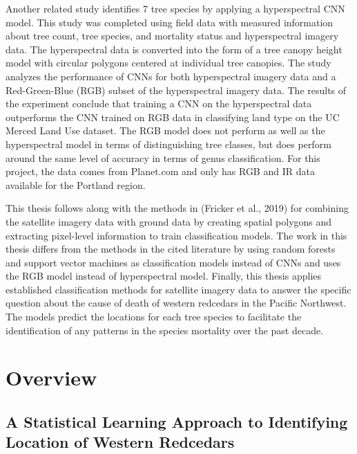 \documentclass[12pt,twoside]{reedthesis}
\begin{document}
Another related study identifies 7 tree species by applying a hyperspectral CNN model. This study was completed using field data with measured information about tree count, tree species, and mortality status and hyperspectral imagery data. The hyperspectral data is converted into the form of a tree canopy height model with circular polygons centered at individual tree canopies. The study analyzes the performance of CNNs for both hyperspectral imagery data and a Red-Green-Blue (RGB) subset of the hyperspectral imagery data. The results of the experiment conclude that training a CNN on the hyperspectral data outperforms the CNN trained on RGB data in classifying land type on the UC Merced Land Use dataset. The RGB model does not perform as well as the hyperspectral model in terms of distinguishing tree classes, but does perform around the same level of accuracy in terms of genus classification. For this project, the data comes from Planet.com and only has RGB and IR data available for the Portland region.

This thesis follows along with the methods in (Fricker et al., 2019) for combining the satellite imagery data with ground data by creating spatial polygons and extracting pixel-level information to train classification models. The work in this thesis differs from the methods in the cited literature by using random forests and support vector machines as classification models instead of CNNs and uses the RGB model instead of hyperspectral model. Finally, this thesis applies established classification methods for satellite imagery data to answer the specific question about the cause of death of western redcedars in the Pacific Northwest. The models predict the locations for each tree species to facilitate the identification of any patterns in the species mortality over the past decade.

\hypertarget{overview}{%
\section{Overview}\label{overview}}

\hypertarget{a-statistical-learning-approach-to-identifying-location-of-western-redcedars}{%
\subsection{A Statistical Learning Approach to Identifying Location of Western Redcedars}\label{a-statistical-learning-approach-to-identifying-location-of-western-redcedars}}
\end{document}
